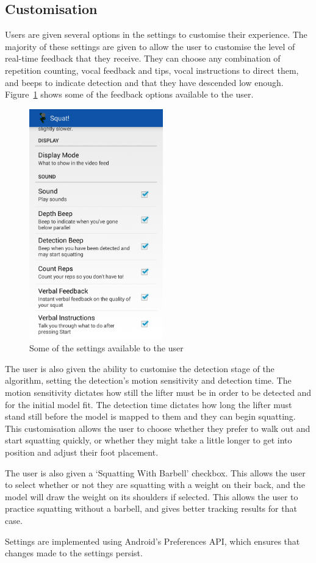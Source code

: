 \subsection{Customisation}

Users are given several options in the settings to customise their experience. The majority of these settings are given to allow the user to customise the level of real-time feedback that they receive. They can choose any combination of repetition counting, vocal feedback and tips, vocal instructions to direct them, and beeps to indicate detection and that they have descended low enough. Figure~\ref{fig:settings} shows some of the feedback options available to the user.

\begin{figure}[H]
    \centering
	\includegraphics[height=10cm]{application/images/settings}
\caption{Some of the settings available to the user}
\label{fig:settings}
\end{figure}

The user is also given the ability to customise the detection stage of the algorithm, setting the detection's motion sensitivity and detection time. The motion sensitivity dictates how still the lifter must be in order to be detected and for the initial model fit. The detection time dictates how long the lifter must stand still before the model is mapped to them and they can begin squatting. This customisation allows the user to choose whether they prefer to walk out and start squatting quickly, or whether they might take a little longer to get into position and adjust their foot placement.

The user is also given a `Squatting With Barbell' checkbox. This allows the user to select whether or not they are squatting with a weight on their back, and the model will draw the weight on its shoulders if selected. This allows the user to practice squatting without a barbell, and gives better tracking results for that case.

Settings are implemented using Android's Preferences API, which ensures that changes made to the settings persist.